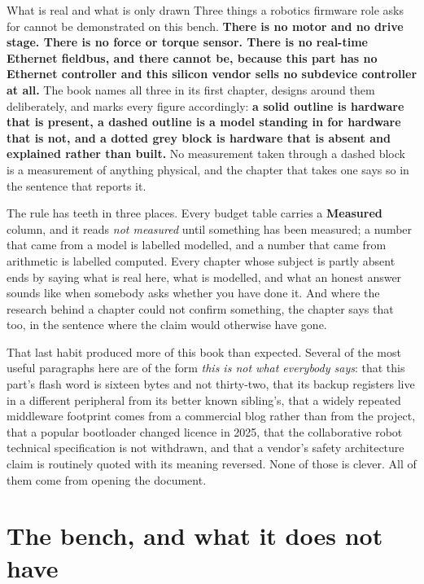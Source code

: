 \begin{note}{What is real and what is only drawn}
Three things a robotics firmware role asks for cannot be demonstrated on this
bench. \textbf{There is no motor and no drive stage. There is no force or torque
sensor. There is no real-time Ethernet fieldbus, and there cannot be, because
this part has no Ethernet controller and this silicon vendor sells no subdevice
controller at all.} The book names all three in its first chapter, designs
around them deliberately, and marks every figure accordingly: \textbf{a solid
outline is hardware that is present, a dashed outline is a model standing in for
hardware that is not, and a dotted grey block is hardware that is absent and
explained rather than built.} No measurement taken through a dashed block is a
measurement of anything physical, and the chapter that takes one says so in the
sentence that reports it.
\end{note}

The rule has teeth in three places. Every budget table carries a
\textbf{Measured} column, and it reads \emph{not measured} until something has
been measured; a number that came from a model is labelled modelled, and a
number that came from arithmetic is labelled computed. Every chapter whose
subject is partly absent ends by saying what is real here, what is modelled, and
what an honest answer sounds like when somebody asks whether you have done it.
And where the research behind a chapter could not confirm something, the chapter
says that too, in the sentence where the claim would otherwise have gone.

That last habit produced more of this book than expected. Several of the most
useful paragraphs here are of the form \emph{this is not what everybody says}:
that this part's flash word is sixteen bytes and not thirty-two, that its
backup registers live in a different peripheral from its better known sibling's,
that a widely repeated middleware footprint comes from a commercial blog rather
than from the project, that a popular bootloader changed licence in 2025, that
the collaborative robot technical specification is not withdrawn, and that a
vendor's safety architecture claim is routinely quoted with its meaning
reversed. None of those is clever. All of them come from opening the document.

\section*{The bench, and what it does not have}


